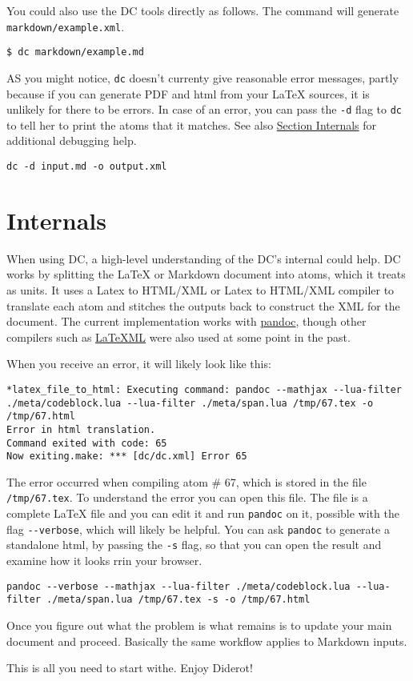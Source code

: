\begin{gram}
You could also use the DC tools directly as follows.
%
The command will generate  \lstinline`markdown/example.xml`.

\begin{lstlisting}
$ dc markdown/example.md
\end{lstlisting}

\end{gram}

\begin{gram} 
AS you might notice, \lstinline`dc` doesn't currenty give reasonable error messages, partly because if you can generate PDF and html from your LaTeX sources, it is unlikely for there to be errors. 
%
In case of an error, you can pass the \lstinline`-d` flag to \lstinline`dc` to tell her to print the atoms that it matches.
%
See also \href{sec:dc::internals}{Section Internals} for additional debugging help.
\begin{lstlisting}
dc -d input.md -o output.xml
\end{lstlisting}
\end{gram}

\section{Internals}
\label{sec:dc::internals}

When using DC, a high-level understanding of the DC's internal could help.
%
DC works by splitting the LaTeX or Markdown document into atoms, which it treats as units.
%
It uses a Latex to HTML/XML or Latex to HTML/XML compiler to translate each atom and stitches the outputs back to construct the XML for the document.
%
The current implementation works with \href{https://www.pandoc.org}{pandoc}, though other compilers such as \href{https://dlmf.nist.gov/LaTeXML/}{LaTeXML} were also used at some point in the past.

When you receive an error, it will likely look like this:
\begin{lstlisting}
*latex_file_to_html: Executing command: pandoc --mathjax --lua-filter ./meta/codeblock.lua --lua-filter ./meta/span.lua /tmp/67.tex -o /tmp/67.html
Error in html translation.
Command exited with code: 65
Now exiting.make: *** [dc/dc.xml] Error 65
\end{lstlisting} 
% 
The error occurred when compiling atom \# 67, which is stored in the file \lstinline`/tmp/67.tex`.
%
To understand the error you can open this file.  The file is a complete LaTeX file and you can edit it and run \lstinline`pandoc` on it, possible with the flag \lstinline`--verbose`, which will likely be helpful.
%
You can ask \lstinline`pandoc` to generate a standalone html, by passing the \lstinline`-s` flag, so that you can open the result and examine how it looks rrin your browser.
%
\begin{lstlisting}
pandoc --verbose --mathjax --lua-filter ./meta/codeblock.lua --lua-filter ./meta/span.lua /tmp/67.tex -s -o /tmp/67.html
\end{lstlisting}
%
Once you figure out what the problem is what remains is to update your main document and proceed.
%
Basically the same workflow applies to Markdown inputs.


This is all you need to start withe.  Enjoy Diderot!
